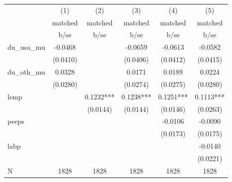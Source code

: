 \begin{tabular}{lccccc}
\toprule
 & (1) & (2) & (3) & (4) & (5) \\
 & matched & matched & matched & matched & matched \\
 & b/se & b/se & b/se & b/se & b/se \\
\midrule
du\_usa\_mu & -0.0468 &  & -0.0659 & -0.0613 & -0.0582 \\
 & (0.0410) &  & (0.0406) & (0.0412) & (0.0415) \\
du\_oth\_mu & 0.0328 &  & 0.0171 & 0.0189 & 0.0224 \\
 & (0.0280) &  & (0.0274) & (0.0275) & (0.0280) \\
lemp &  & 0.1232*** & 0.1238*** & 0.1251*** & 0.1113*** \\
 &  & (0.0144) & (0.0144) & (0.0146) & (0.0263) \\
peeps &  &  &  & -0.0106 & -0.0090 \\
 &  &  &  & (0.0173) & (0.0175) \\
labp &  &  &  &  & -0.0140 \\
 &  &  &  &  & (0.0221) \\
\midrule
N & 1828 & 1828 & 1828 & 1828 & 1828 \\
\bottomrule
\end{tabular}
